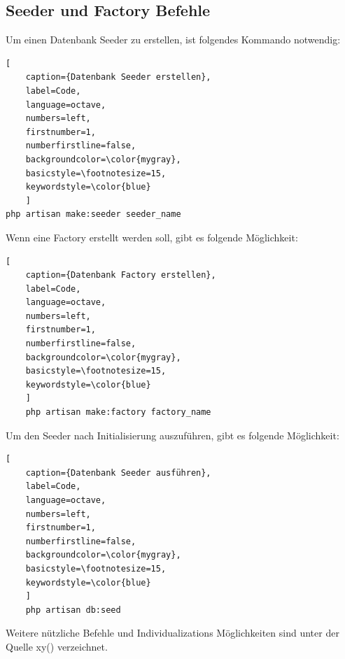 \subsection{Seeder und Factory Befehle}
Um einen Datenbank Seeder zu erstellen, ist folgendes Kommando notwendig: 
\begin{lstlisting}[
	caption={Datenbank Seeder erstellen},
	label=Code,
	language=octave,
	numbers=left,
	firstnumber=1,
	numberfirstline=false,
	backgroundcolor=\color{mygray},
	basicstyle=\footnotesize=15,
	keywordstyle=\color{blue}
	]
php artisan make:seeder seeder_name
\end{lstlisting}
Wenn eine Factory erstellt werden soll, gibt es folgende Möglichkeit:
\begin{lstlisting}[
	caption={Datenbank Factory erstellen},
	label=Code,
	language=octave,
	numbers=left,
	firstnumber=1,
	numberfirstline=false,
	backgroundcolor=\color{mygray},
	basicstyle=\footnotesize=15,
	keywordstyle=\color{blue}
	]
	php artisan make:factory factory_name
\end{lstlisting}

Um den Seeder nach Initialisierung auszuführen, gibt es folgende Möglichkeit:
\begin{lstlisting}[
	caption={Datenbank Seeder ausführen},
	label=Code,
	language=octave,
	numbers=left,
	firstnumber=1,
	numberfirstline=false,
	backgroundcolor=\color{mygray},
	basicstyle=\footnotesize=15,
	keywordstyle=\color{blue}
	]
	php artisan db:seed
\end{lstlisting}
Weitere nützliche Befehle und Individualizations Möglichkeiten sind unter der Quelle xy() verzeichnet.
